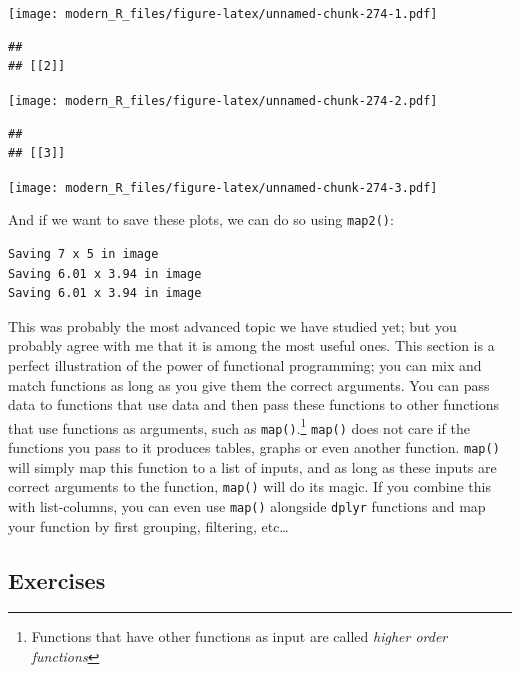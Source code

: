 \documentclass[]{gitbook}
\newenvironment{Shaded}{\begin{snugshade}}{\end{snugshade}}
\newcommand{\KeywordTok}[1]{\textcolor[rgb]{0.13,0.29,0.53}{\textbf{#1}}}
\newcommand{\NormalTok}[1]{#1}
\newcommand{\OperatorTok}[1]{\textcolor[rgb]{0.81,0.36,0.00}{\textbf{#1}}}
\newcommand{\StringTok}[1]{\textcolor[rgb]{0.31,0.60,0.02}{#1}}
\let\rmarkdownfootnote\footnote%
\def\footnote{\protect\rmarkdownfootnote}
\theoremstyle{definition}
\theoremstyle{definition}
\theoremstyle{definition}
\theoremstyle{remark}
\begin{document}
\texttt{[image: modern\_R\_files/figure-latex/unnamed-chunk-274-1.pdf]}

\begin{verbatim}
## 
## [[2]]
\end{verbatim}

\texttt{[image: modern\_R\_files/figure-latex/unnamed-chunk-274-2.pdf]}

\begin{verbatim}
## 
## [[3]]
\end{verbatim}

\texttt{[image: modern\_R\_files/figure-latex/unnamed-chunk-274-3.pdf]}

And if we want to save these plots, we can do so using \texttt{map2()}:

\begin{Shaded}
\end{Shaded}

\begin{verbatim}
Saving 7 x 5 in image
Saving 6.01 x 3.94 in image
Saving 6.01 x 3.94 in image
\end{verbatim}

This was probably the most advanced topic we have studied yet; but you
probably agree with me that it is among the most useful ones. This
section is a perfect illustration of the power of functional
programming; you can mix and match functions as long as you give them
the correct arguments. You can pass data to functions that use data and
then pass these functions to other functions that use functions as
arguments, such as \texttt{map()}.\footnote{Functions that have other
  functions as input are called \emph{higher order functions}}
\texttt{map()} does not care if the functions you pass to it produces
tables, graphs or even another function. \texttt{map()} will simply map
this function to a list of inputs, and as long as these inputs are
correct arguments to the function, \texttt{map()} will do its magic. If
you combine this with list-columns, you can even use \texttt{map()}
alongside \texttt{dplyr} functions and map your function by first
grouping, filtering, etc\ldots{}

\hypertarget{exercises-3}{%
\subsection{Exercises}\label{exercises-3}}
\end{document}

